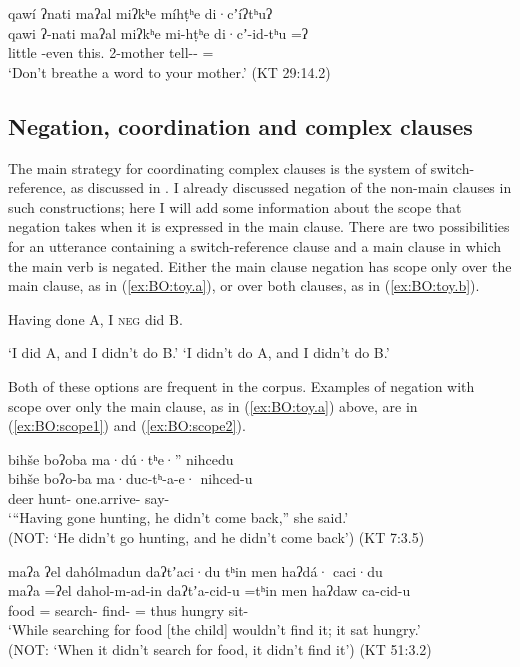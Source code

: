 \documentclass[output=paper,modfonts,nonflat,colorlinks,citecolor=brown]{langscibook}
\begin{document}
{%
\ea 
\label{ex:BO:even2}
\glll qawí ʔnati maʔal miʔkʰe míhṭʰe di·cʼíʔtʰuʔ\\
    qawi ʔ-nati maʔal miʔkʰe mi-hṭʰe di·cʼ-id-tʰu =ʔ\\
    little -even this.  2-mother tell-- =\\
\glt `Don’t breathe a word to your mother.' ({KT 29:14.2})\\
\z
}%

\subsection{Negation, coordination and complex clauses}
\label{sec:BO:SRscope}
The main strategy for coordinating complex clauses is the system of switch-reference, as discussed in . I already discussed negation of the non-main clauses in such constructions; here I will add some information about the scope that negation takes when it is expressed in the main clause. There are two possibilities for an utterance containing a switch-reference clause and a main clause in which the main verb is negated. Either the main clause negation has scope only over the main clause, as in (\ref{ex:BO:toy.a}), or over both clauses, as in (\ref{ex:BO:toy.b}).

{%
\ea Having done A, I \textsc{neg} did B.
\label{ex:BO:toy}
\begin{xlist}
\ex `I did A, and I didn't do B.'\label{ex:BO:toy.a}
\ex `I didn't do A, and I didn't do B.'\label{ex:BO:toy.b}
\end{xlist}
\z
}

Both of these options are frequent in the corpus.
Examples of negation with scope over only the main clause, as in (\ref{ex:BO:toy.a}) above, are in (\ref{ex:BO:scope1}) and (\ref{ex:BO:scope2}).

\ea 
\label{ex:BO:scope1}
\glll {}bihše boʔoba ma·dú·tʰe·'' nihcedu\\
    bihše boʔo-ba ma·duc-tʰ-a-e· nihced-u\\
    deer hunt- one.arrive- say-\\
\glt `“Having gone hunting, he didn’t come back,” she said.'\\
(NOT: `He didn't go hunting, and he didn't come back') ({KT 7:3.5})\\
\z

{%
\ea 
\label{ex:BO:scope2}
\glll maʔa ʔel dahólmadun daʔtʼaci·du tʰin men haʔdá· caci·du\\
    maʔa =ʔel dahol-m-ad-in daʔtʼa-cid-u =tʰin men haʔdaw ca-cid-u\\
    food = search- find- = thus hungry sit-\\
\glt `While searching for food [the child] wouldn’t find it; it sat hungry.'\\
(NOT: `When it didn't search for food, it didn't find it') ({KT 51:3.2})\\
\z
}%
\end{document}
